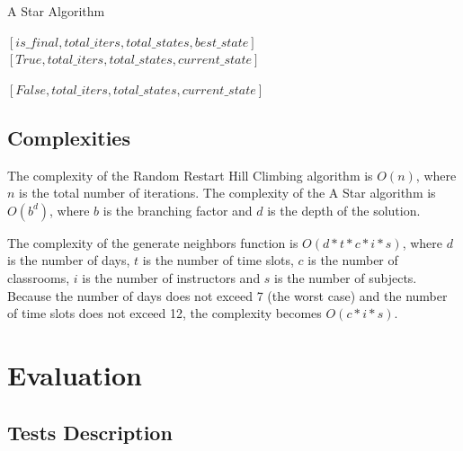 \documentclass[runningheads]{paper}
\begin{document}
\begin{algorithm} 
\caption{A Star Algorithm}
\label{alg2}
\begin{algorithmic}[1]
 \Return $[is\_final, total\_iters, total\_states, best\_state] $
\Return $[True, total\_iters, total\_states, current\_state]$
\EndIf

\EndIf
\EndFor
\EndWhile
\State \Return $[False, total\_iters, total\_states, current\_state]$
\EndProcedure
\end{algorithmic}
\end{algorithm}

\subsection{Complexities}
The complexity of the Random Restart Hill Climbing algorithm is $O(n)$, where
$n$ is the total number of iterations. The complexity of the A Star algorithm is
$O(b^d)$, where $b$ is the branching factor and $d$ is the depth of the solution.


The complexity of the generate neighbors function is $O(d*t*c*i*s)$, where $d$ is
the number of days, $t$ is the number of time slots, $c$ is the number of classrooms,
$i$ is the number of instructors and $s$ is the number of subjects. Because the number
of days does not exceed 7 (the worst case) and the number of time slots does not exceed 12, 
the complexity becomes $O(c*i*s)$.

\section{Evaluation}
\subsection{Tests Description}
\end{document}
